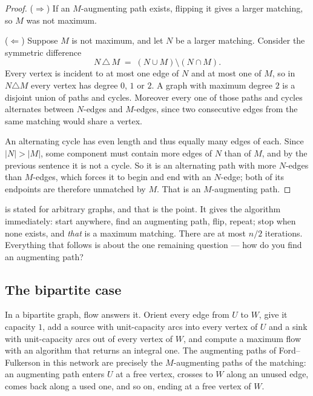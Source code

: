 \begin{proof}
($\Rightarrow$) If an $M$-augmenting path exists, flipping it gives a larger
matching, so $M$ was not maximum.

($\Leftarrow$) Suppose $M$ is not maximum, and let $N$ be a larger matching.
Consider the symmetric difference
\[ N \,\triangle\, M \;=\; (N \cup M) \setminus (N \cap M). \]
Every vertex is incident to at most one edge of $N$ and at most one of $M$, so
in $N \triangle M$ every vertex has degree $0$, $1$ or $2$. A graph with
maximum degree $2$ is a disjoint union of paths and cycles. Moreover every one
of those paths and cycles alternates between $N$-edges and $M$-edges, since two
consecutive edges from the same matching would share a vertex.

An alternating cycle has even length and thus equally many edges of each. Since
$|N| > |M|$, some component must contain more edges of $N$ than of $M$, and by
the previous sentence it is not a cycle. So it is an alternating path with more
$N$-edges than $M$-edges, which forces it to begin and end with an $N$-edge;
both of its endpoints are therefore unmatched by $M$. That is an
$M$-augmenting path.
\end{proof}

 is stated for arbitrary graphs, and that is the point.
It gives the algorithm immediately: start anywhere, find an augmenting path,
flip, repeat; stop when none exists, and \emph{that} is a maximum matching.
There are at most $n/2$ iterations. Everything that follows is about the one
remaining question --- how do you find an augmenting path?

\subsection{The bipartite case}
\label{sec:matching-bipartite}

In a bipartite graph, flow answers it. Orient every edge from $U$ to $W$, give
it capacity $1$, add a source with unit-capacity arcs into every vertex of $U$
and a sink with unit-capacity arcs out of every vertex of $W$, and compute a
maximum flow with an algorithm that returns an integral one. The augmenting
paths of Ford--Fulkerson in this network are precisely the $M$-augmenting paths
of the matching: an augmenting path enters $U$ at a free vertex, crosses to $W$
along an unused edge, comes back along a used one, and so on, ending at a free
vertex of $W$.

